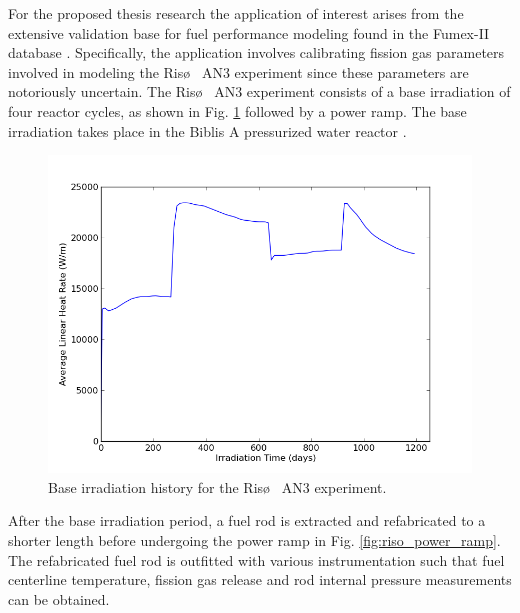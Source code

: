 For the proposed thesis research the application of interest arises from the extensive validation base for fuel performance modeling found in the Fumex-II database \cite{fumex2}. 
Specifically, the application involves calibrating fission gas parameters involved in modeling the Ris\o~ AN3 experiment since these parameters are notoriously uncertain. The Ris\o~ AN3 experiment consists of a base irradiation of four reactor cycles, as shown in Fig. \ref{fig:riso_base_irradiation} followed by a power ramp. The base irradiation takes place in the Biblis A pressurized water reactor \cite{fumex2}. 
\begin{figure}
\caption{\label{fig:riso_base_irradiation}
Base irradiation history for the Ris\o~ AN3 experiment.}
 \begin{center}
  \includegraphics[scale=.75]{./Ongoing_Work/base_irrad.png}
 \end{center}
\end{figure}     
After the base irradiation period, a fuel rod is extracted and refabricated to a shorter length before undergoing the power ramp in Fig. \ref{fig:riso_power_ramp}. The refabricated fuel rod is outfitted with various instrumentation such that fuel centerline temperature, fission gas release and rod internal pressure measurements can be obtained.  
